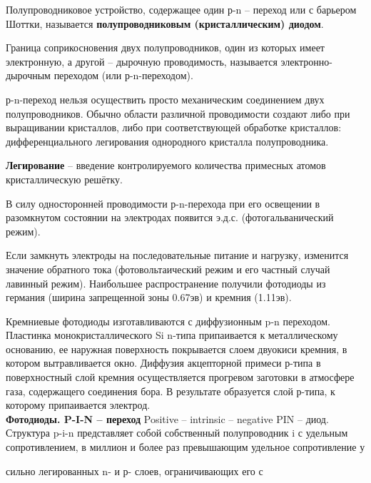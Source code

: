 \documentclass[12pt]{article}
\begin{document}
Полупроводниковое устройство,
содержащее один р-n -- переход или с
барьером Шоттки, называется
\textbf{полупроводниковым (кристаллическим)
диодом}.

Граница соприкосновения двух
полупроводников, один из которых имеет
электронную, а другой -- дырочную
проводимость, называется электронно-
дырочным переходом (или р-n-переходом).

р-n-переход нельзя осуществить просто механическим соединением двух
полупроводников.
Обычно области различной проводимости создают либо при выращивании кристаллов,
либо при соответствующей обработке кристаллов: дифференциального легирования
однородного кристалла полупроводника.

\textbf{Легирование} – введение контролируемого количества примесных атомов кристаллическую решётку.

В силу односторонней проводимости р-n-перехода при
его освещении в разомкнутом состоянии на электродах
появится э.д.с. (фотогальванический режим).

Если замкнуть электроды на последовательные
питание и нагрузку, изменится значение обратного тока
(фотовольтаический режим и его частный случай
лавинный режим).
Наибольшее распространение получили фотодиоды из германия (ширина
запрещенной зоны 0.67эв) и кремния (1.11эв).

Кремниевые фотодиоды изготавливаются с диффузионным p-n переходом.
Пластинка монокристаллического Si n-типа припаивается к металлическому
основанию, ее наружная поверхность покрывается слоем двуокиси кремния, в
котором вытравливается окно.
Диффузия акцепторной примеси р-типа в поверхностный слой кремния
осуществляется прогревом заготовки в атмосфере газа, содержащего соединения
бора.
В результате образуется слой р-типа, к которому припаивается электрод.\\


\textbf{Фотодиоды. P-I-N – переход} 
Positive – intrinsic – negative
PIN – диод.
Структура p-i-n представляет
собой собственный
полупроводник i с удельным
сопротивлением, в миллион и
более раз превышающим
удельное сопротивление у

сильно легированных n- и р-
слоев, ограничивающих его с
\end{document}
